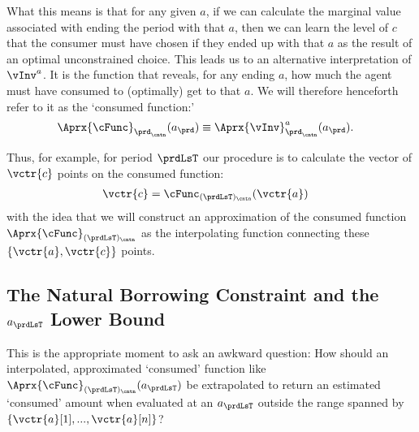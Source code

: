 \documentclass[\econtexRoot/SolvingMicroDSOPs]{subfiles}
\begin{document}
What this means is that for any given ${a}$, if we can calculate the marginal value associated with ending the period with that ${a}$, then we can learn the level of ${c}$ that the consumer must have chosen if they ended up with that ${a}$ as the result of an optimal unconstrained choice.  This leads us to an alternative interpretation of $\vInv^{a}$. It is the function that reveals, for any ending ${a}$, how much the agent must have consumed to (optimally) get to that ${a}$.  We will therefore henceforth refer to it as the `consumed function:'
\begin{equation}\begin{gathered}\begin{aligned}
      \Aprx{\cFunc}_{\prd_\cntn}({a}_{\prd}) & \equiv \Aprx{\vInv}^{a}_{\prd_\cntn}({a}_{\prd}) \label{eq:consumedfn}.    
    \end{aligned}\end{gathered}\end{equation}

Thus, for example, for period $\prdLsT$ our procedure is to calculate the vector of $\vctr{c}$ points on the consumed function:
\begin{equation}\begin{gathered}\begin{aligned}
      \vctr{c} & = \cFunc_{({\prdLsT})_\cntn}(\vctr{a}) \label{eq:consumedfnvecs}     
    \end{aligned}\end{gathered}\end{equation}
with the idea that we will construct an approximation of the consumed function $\Aprx{\cFunc}_{({\prdLsT})_\cntn}$ as the interpolating function connecting these $\{\vctr{a},\vctr{c}\}$ points.

\hypertarget{the-natural-borrowing-constraint-and-the-a-lower-bound}{}
\subsection{The Natural Borrowing Constraint and the $a_{\prdLsT}$ Lower Bound} \label{subsec:LiqConstrSelfImposed}

This is the appropriate moment to ask an awkward question: How should an interpolated, approximated `consumed' function like $\Aprx{\cFunc}_{({\prdLsT})_\cntn}({a}_{\prdLsT})$ be extrapolated to return an estimated `consumed' amount when evaluated at an ${a}_{\prdLsT}$ outside the range spanned by $\{\vctr{{a}}[1],...,\vctr{a}[n]\}$?
\end{document}
